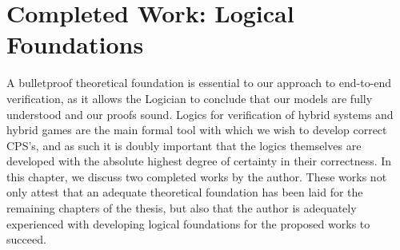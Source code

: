 \documentclass[12pt]{cmuthesis}
\theoremstyle{definition}
\theoremstyle{remark}
\begin{document}
\chapter{Completed Work:  Logical Foundations}
\label{ch:logical-foundations}
A bulletproof theoretical foundation is essential to our approach to end-to-end verification, as it allows the Logician to conclude that our models are fully understood and our proofs sound.
Logics for verification of hybrid systems and hybrid games are the main formal tool with which we wish to develop correct CPS's, and as such it is doubly important that the logics themselves are developed with the absolute highest degree of certainty in their correctness.
In this chapter, we discuss two completed works by the author.
These works not only attest that an adequate theoretical foundation has been laid for the remaining chapters of the thesis, but also that the author is adequately experienced with developing logical foundations for the proposed works to succeed.
\end{document}
